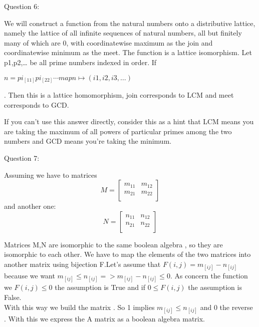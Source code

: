 \documentclass[addpoints,10pt,answers]{exam}
\begin{document}
\begin{questions}
\question Question 6:
\begin{solution}
We will construct a function from the natural numbers onto a distributive lattice, namely the lattice of all infinite sequences of natural numbers, all but finitely many of which are 0, with coordinatewise maximum as the join and coordinatewise minimum as the meet. The function is a lattice isomorphism. Let p1,p2,… be all prime numbers indexed in order. If

$n=pi_[11]pi_[22]⋯
map n↦(i1,i2,i3,…)$

. Then this is a lattice homomorphism, join corresponds to LCM and meet corresponds to GCD.

If you can't use this answer directly, consider this as a hint that LCM means you are taking the maximum of all powers of particular primes among the two numbers and GCD means you're taking the minimum.
\end{solution}



\question Question 7:
\begin{solution}
Assuming we have to matrices 
$$
M=
\begin{bmatrix}
	m_{11}       & m_{12}  \\
	m_{21}       & m_{22} \\
\end{bmatrix}
$$
and another one:
$$
N=
\begin{bmatrix}
	n_{11}       & n_{12} \\
	n_{21}       & n_{22} \\
\end{bmatrix}
$$

Matrices M,N are isomorphic to the same boolean algebra , so they are isomorphic to each other. We have to map the elements of the two matrices into another matrix using bijection F.Let's assume that $F(i,j) = m_[ij] - n_[ij]$ because we want $m_[ij] \leq n_[ij] => m_[ij] - n_[ij] \leq 0 $. As concern the function we $F(i,j) \leq 0 $ the assumption is True and if $0\leq F(i,j)$ the assumption is False.\\
With this way we build the matrix . So 1 implies $m_[ij]\leq n_[ij]$ and 0 the reverse . With this we express the A matrix as a boolean algebra matrix.
\end{solution}



\end{questions}
\end{document}
